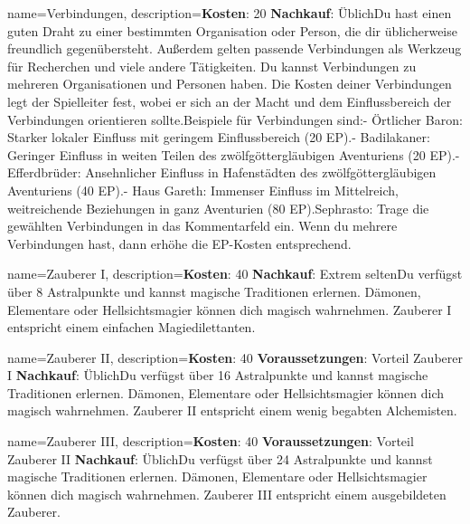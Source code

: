 {
    name={Verbindungen},
    description={\textbf{Kosten}: 20 \textbf{Nachkauf}: Üblich\newline Du hast einen guten Draht zu einer bestimmten Organisation oder Person, die dir üblicherweise freundlich gegenübersteht. Außerdem gelten passende Verbindungen als Werkzeug für Recherchen und viele andere Tätigkeiten. Du kannst Verbindungen zu mehreren Organisationen und Personen haben. Die Kosten deiner Verbindungen legt der Spielleiter fest, wobei er sich an der Macht und dem Einflussbereich der Verbindungen orientieren sollte.\newline Beispiele für Verbindungen sind:\newline - Örtlicher Baron: Starker lokaler Einfluss mit geringem Einflussbereich (20 EP).\newline - Badilakaner: Geringer Einfluss in weiten Teilen des zwölfgöttergläubigen Aventuriens (20 EP).\newline - Efferdbrüder: Ansehnlicher Einfluss in Hafenstädten des zwölfgöttergläubigen Aventuriens (40 EP).\newline - Haus Gareth: Immenser Einfluss im Mittelreich, weitreichende Beziehungen in ganz Aventurien (80 EP).\newline Sephrasto: Trage die gewählten Verbindungen in das Kommentarfeld ein. Wenn du mehrere Verbindungen hast, dann erhöhe die EP-Kosten entsprechend.}
}


{
    name={Zauberer I},
    description={\textbf{Kosten}: 40 \textbf{Nachkauf}: Extrem selten\newline Du verfügst über 8 Astralpunkte und kannst magische Traditionen erlernen. Dämonen, Elementare oder Hellsichtsmagier können dich magisch wahrnehmen. Zauberer I entspricht einem einfachen Magiedilettanten.}
}


{
    name={Zauberer II},
    description={\textbf{Kosten}: 40 \textbf{Voraussetzungen}: Vorteil Zauberer I \textbf{Nachkauf}: Üblich\newline Du verfügst über 16 Astralpunkte und kannst magische Traditionen erlernen. Dämonen, Elementare oder Hellsichtsmagier können dich magisch wahrnehmen. Zauberer II entspricht einem wenig begabten Alchemisten. }
}


{
    name={Zauberer III},
    description={\textbf{Kosten}: 40 \textbf{Voraussetzungen}: Vorteil Zauberer II \textbf{Nachkauf}: Üblich\newline Du verfügst über 24 Astralpunkte und kannst magische Traditionen erlernen. Dämonen, Elementare oder Hellsichtsmagier können dich magisch wahrnehmen. Zauberer III entspricht einem ausgebildeten Zauberer.}
}


